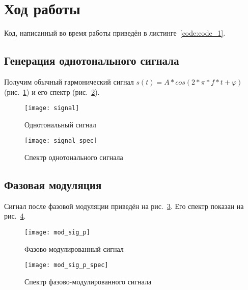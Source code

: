 \section{Ход работы}
Код, написанный во время работы приведён в листинге~\ref{code:code_1}. 

\subsection{Генерация однотонального сигнала}
Получим обычный гармонический сигнал  $s(t) = A*cos(2*\pi * f*t + \varphi)$ (рис.~\ref{pic:signal_one_tone}) и его спектр (рис.~\ref{pic:signal_one_tone_spec}).
\begin{figure}[H]
	\begin{center}
		\texttt{[image: signal]}
		\caption{Однотональный сигнал} 
		\label{pic:signal_one_tone} %
	\end{center}
\end{figure}
\begin{figure}[H]
	\begin{center}
		\texttt{[image: signal\_spec]}
		\caption{Спектр однотонального сигнала} 
		\label{pic:signal_one_tone_spec} %
	\end{center}
\end{figure}


\subsection{Фазовая модуляция}
Сигнал после фазовой модуляции приведён на рис.~\ref{pic:phase_mod_sig_carr}. Его спектр показан на рис.~\ref{pic:phase_mod_sig_carr_spec}.
\begin{figure}[H]
	\begin{center}
		\texttt{[image: mod\_sig\_p]}
		\caption{Фазово-модулированный сигнал} 
		\label{pic:phase_mod_sig_carr} %
	\end{center}
\end{figure}
\begin{figure}[H]
	\begin{center}
		\texttt{[image: mod\_sig\_p\_spec]}
		\caption{Спектр фазово-модулированного сигнала} 
		\label{pic:phase_mod_sig_carr_spec} %
	\end{center}
\end{figure}

